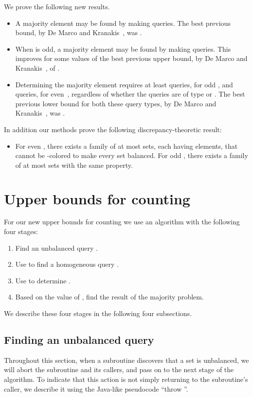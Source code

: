 \documentclass[11pt]{llncs}
\begin{document}
We prove the following new results.
\begin{itemize}
\item A majority element may be found by making   queries. The best previous bound, by De Marco and Kranakis~\cite{DeMKra-DMAA-15}, was .
\item When  is odd, a majority element may be found by making   queries. This improves for some values of  the best previous upper bound, by De Marco and Kranakis~\cite{DeMKra-DMAA-15}, of .
\item Determining the majority element requires at least  queries, for odd , and  queries, for even~, regardless of whether the queries are of type  or . The best previous lower bound for both these query types, by De Marco and Kranakis~\cite{DeMKra-DMAA-15}, was .
\end{itemize}
In addition our methods prove the following discrepancy-theoretic result:
\begin{itemize}
\item For even , there exists a family of at most  sets, each having  elements, that cannot be -colored to make every set balanced. For odd , there exists a family of at most  sets with the same property.
\end{itemize}

\section{Upper bounds for counting}

For our new upper bounds for counting we use an algorithm with the following four stages:
\begin{enumerate}
\item Find an unbalanced query .
\item Use  to find a homogeneous query .
\item Use  to determine .
\item Based on the value of , find the result of the majority problem.
\end{enumerate}

We describe these four stages in the following four subsections.

\subsection{Finding an unbalanced query}
Throughout this section, when a subroutine discovers that a set  is unbalanced, we will abort the subroutine and its callers, and pass  on to the next stage of the algorithm. To indicate that this action is not simply returning to the subroutine's caller, we describe it using the Java-like pseudocode ``throw ''.
\end{document}
